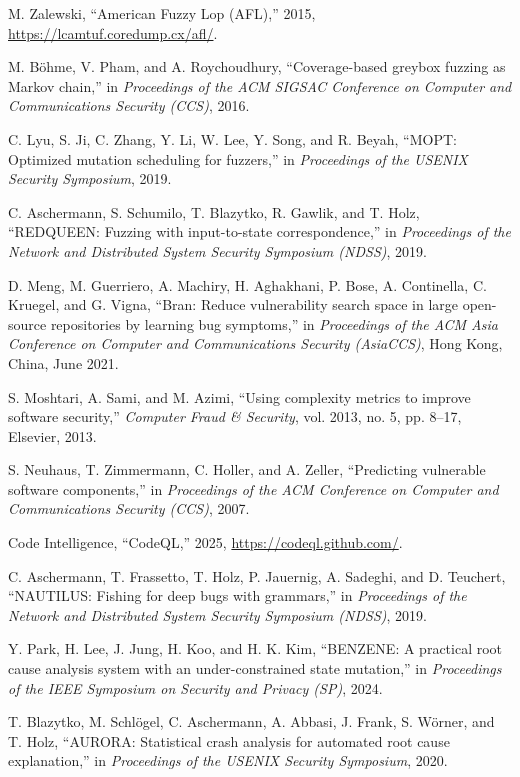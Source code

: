 M. Zalewski, ``American Fuzzy Lop (AFL),'' 2015, \url{https://lcamtuf.coredump.cx/afl/}.

M. Böhme, V. Pham, and A. Roychoudhury, ``Coverage-based greybox fuzzing as Markov chain,'' in \textit{Proceedings of the ACM SIGSAC Conference on Computer and Communications Security (CCS)}, 2016.

C. Lyu, S. Ji, C. Zhang, Y. Li, W. Lee, Y. Song, and R. Beyah, ``MOPT: Optimized mutation scheduling for fuzzers,'' in \textit{Proceedings of the USENIX Security Symposium}, 2019.

C. Aschermann, S. Schumilo, T. Blazytko, R. Gawlik, and T. Holz, ``REDQUEEN: Fuzzing with input-to-state correspondence,'' in \textit{Proceedings of the Network and Distributed System Security Symposium (NDSS)}, 2019.

D. Meng, M. Guerriero, A. Machiry, H. Aghakhani, P. Bose, A. Continella, C. Kruegel, and G. Vigna, ``Bran: Reduce vulnerability search space in large open-source repositories by learning bug symptoms,'' in \textit{Proceedings of the ACM Asia Conference on Computer and Communications Security (AsiaCCS)}, Hong Kong, China, June 2021.

S. Moshtari, A. Sami, and M. Azimi, ``Using complexity metrics to improve software security,'' \textit{Computer Fraud \& Security}, vol. 2013, no. 5, pp. 8--17, Elsevier, 2013.

S. Neuhaus, T. Zimmermann, C. Holler, and A. Zeller, ``Predicting vulnerable software components,'' in \textit{Proceedings of the ACM Conference on Computer and Communications Security (CCS)}, 2007.

Code Intelligence, ``CodeQL,'' 2025, \url{https://codeql.github.com/}.

C. Aschermann, T. Frassetto, T. Holz, P. Jauernig, A. Sadeghi, and D. Teuchert, ``NAUTILUS: Fishing for deep bugs with grammars,'' in \textit{Proceedings of the Network and Distributed System Security Symposium (NDSS)}, 2019.

Y. Park, H. Lee, J. Jung, H. Koo, and H. K. Kim, ``BENZENE: A practical root cause analysis system with an under-constrained state mutation,'' in \textit{Proceedings of the IEEE Symposium on Security and Privacy (SP)}, 2024.

T. Blazytko, M. Schlögel, C. Aschermann, A. Abbasi, J. Frank, S. Wörner, and T. Holz, ``AURORA: Statistical crash analysis for automated root cause explanation,'' in \textit{Proceedings of the USENIX Security Symposium}, 2020.

